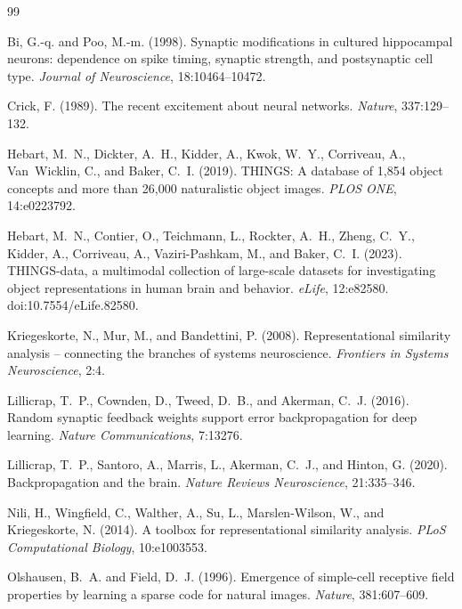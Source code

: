 \documentclass[10pt,twocolumn]{article}
\begin{document}
\begin{thebibliography}{99}

Bi, G.-q. and Poo, M.-m. (1998).
Synaptic modifications in cultured hippocampal neurons: dependence on spike timing, synaptic strength, and postsynaptic cell type.
\textit{Journal of Neuroscience}, 18:10464--10472.

Crick, F. (1989).
The recent excitement about neural networks.
\textit{Nature}, 337:129--132.

Hebart, M.~N., Dickter, A.~H., Kidder, A., Kwok, W.~Y., Corriveau, A., Van~Wicklin, C., and Baker, C.~I. (2019).
THINGS: A database of 1,854 object concepts and more than 26,000 naturalistic object images.
\textit{PLOS ONE}, 14:e0223792.

Hebart, M.~N., Contier, O., Teichmann, L., Rockter, A.~H., Zheng, C.~Y., Kidder, A., Corriveau, A., Vaziri-Pashkam, M., and Baker, C.~I. (2023).
THINGS-data, a multimodal collection of large-scale datasets for investigating object representations in human brain and behavior.
\textit{eLife}, 12:e82580. doi:10.7554/eLife.82580.

Kriegeskorte, N., Mur, M., and Bandettini, P. (2008).
Representational similarity analysis -- connecting the branches of systems neuroscience.
\textit{Frontiers in Systems Neuroscience}, 2:4.

Lillicrap, T.~P., Cownden, D., Tweed, D.~B., and Akerman, C.~J. (2016).
Random synaptic feedback weights support error backpropagation for deep learning.
\textit{Nature Communications}, 7:13276.

Lillicrap, T.~P., Santoro, A., Marris, L., Akerman, C.~J., and Hinton, G. (2020).
Backpropagation and the brain.
\textit{Nature Reviews Neuroscience}, 21:335--346.

Nili, H., Wingfield, C., Walther, A., Su, L., Marslen-Wilson, W., and Kriegeskorte, N. (2014).
A toolbox for representational similarity analysis.
\textit{PLoS Computational Biology}, 10:e1003553.

Olshausen, B.~A. and Field, D.~J. (1996).
Emergence of simple-cell receptive field properties by learning a sparse code for natural images.
\textit{Nature}, 381:607--609.


\end{thebibliography}
\end{document}
